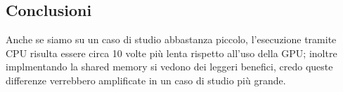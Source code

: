 \documentclass[a4paper]{article}
\begin{document}
\subsection{Conclusioni}

Anche se siamo su un caso di studio abbastanza piccolo, l'esecuzione tramite CPU risulta essere circa 10 volte più lenta rispetto all'uso della GPU; inoltre implmentando la shared memory si vedono dei leggeri benefici, credo queste differenze verrebbero amplificate in un caso di studio più grande.
\end{document}
